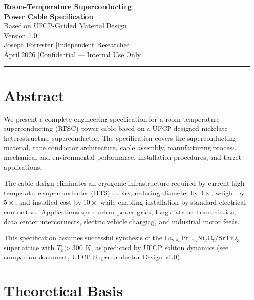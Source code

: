 \documentclass[11pt, a4paper]{article}
\begin{document}
\begin{center}
  {\LARGE \textbf{Room-Temperature Superconducting}}\\[4pt]
  {\LARGE \textbf{Power Cable Specification}}\\[6pt]
  {\large Based on UFCP-Guided Material Design}\\[8pt]
  {\color{nm-gray}\small Version 1.0}\\[4pt]
  {\color{nm-gray}\small Joseph Forrester \quad|\quad Independent Researcher}\\[4pt]
  {\color{nm-gray}\small April 2026 \quad|\quad Confidential --- Internal Use Only}
\end{center}

\vspace{1em}
\hrule
\vspace{1em}

\section*{Abstract}

We present a complete engineering specification for a
room-temperature superconducting (RTSC) power cable based on a
UFCP-designed nickelate heterostructure superconductor. The
specification covers the superconducting material, tape conductor
architecture, cable assembly, manufacturing process, mechanical
and environmental performance, installation procedures, and
target applications.

The cable design eliminates all cryogenic infrastructure required
by current high-temperature superconductor (HTS) cables, reducing
diameter by $4\times$, weight by $5\times$, and installed cost by
$10\times$ while enabling installation by standard electrical
contractors. Applications span urban power grids, long-distance
transmission, data center interconnects, electric vehicle charging,
and industrial motor feeds.

This specification assumes successful synthesis of the
La$_{2.85}$Pr$_{0.15}$Ni$_2$O$_7$/SrTiO$_3$ superlattice with
$T_c > 300$~K, as predicted by UFCP soliton dynamics (see companion
document, UFCP Superconductor Design v1.0).

\tableofcontents

\section{Theoretical Basis}
\label{sec:theory}
\end{document}
